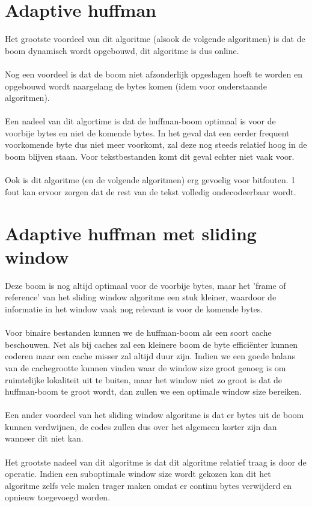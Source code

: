 \documentclass[a4paper,12pt]{report}
\begin{document}
\section{Adaptive huffman}
Het grootste voordeel van dit algoritme (alsook de volgende algoritmen) is dat de boom dynamisch wordt opgebouwd, dit algoritme is dus online. \\ \\
Nog een voordeel is dat de boom niet afzonderlijk opgeslagen hoeft te worden en opgebouwd wordt naargelang de bytes komen (idem voor onderstaande algoritmen). \\ \\
Een nadeel van dit algortime is dat de huffman-boom optimaal is voor de voorbije bytes en niet de komende bytes. In het geval dat een eerder frequent voorkomende byte dus niet meer voorkomt, zal deze nog steeds relatief hoog in de boom blijven staan. Voor tekstbestanden komt dit geval echter niet vaak voor. \\ \\
Ook is dit algoritme (en de volgende algoritmen) erg gevoelig voor bitfouten. 1 fout kan ervoor zorgen dat de rest van de tekst volledig ondecodeerbaar wordt.

\section{Adaptive huffman met sliding window}
Deze boom is nog altijd optimaal voor de voorbije bytes, maar het 'frame of reference' van het sliding window algoritme een stuk kleiner, waardoor de informatie in het window vaak nog relevant is voor de komende bytes. \\ \\
Voor binaire bestanden kunnen we de huffman-boom als een soort cache beschouwen. Net als bij caches zal een kleinere boom de byte effici\"enter kunnen coderen maar een cache misser zal altijd duur zijn. Indien we een goede balans van de cachegrootte kunnen vinden waar de window size groot genoeg is om ruimtelijke lokaliteit uit te buiten, maar het window niet zo groot is dat de huffman-boom te groot wordt, dan zullen we een optimale window size bereiken. \\ \\
Een ander voordeel van het sliding window algoritme is dat er bytes uit de boom kunnen verdwijnen, de codes zullen dus over het algemeen korter zijn dan wanneer dit niet kan. \\ \\
Het grootste nadeel van dit algoritme is dat dit algoritme relatief traag is door de  operatie. Indien een suboptimale window size wordt gekozen kan dit het algoritme zelfs vele malen trager maken omdat er continu bytes verwijderd en opnieuw toegevoegd worden.
\end{document}
